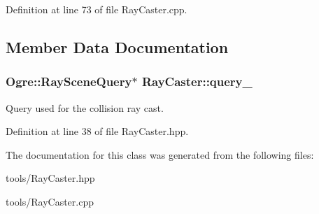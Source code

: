 Definition at line 73 of file Ray\+Caster.\+cpp.



\subsection{Member Data Documentation}
\subsubsection[{\texorpdfstring{query\+\_\+}{query_}}]{\setlength{\rightskip}{0pt plus 5cm}Ogre\+::\+Ray\+Scene\+Query$\ast$ Ray\+Caster\+::query\+\_\+\hspace{0.3cm}{\ttfamily [private]}}\hypertarget{class_ray_caster_ab086a0e4d34aa835c2a5289ee786832e}{}\label{class_ray_caster_ab086a0e4d34aa835c2a5289ee786832e}


Query used for the collision ray cast. 



Definition at line 38 of file Ray\+Caster.\+hpp.



The documentation for this class was generated from the following files\+:\begin{DoxyCompactItemize}
\item 
tools/Ray\+Caster.\+hpp\item 
tools/Ray\+Caster.\+cpp\end{DoxyCompactItemize}
